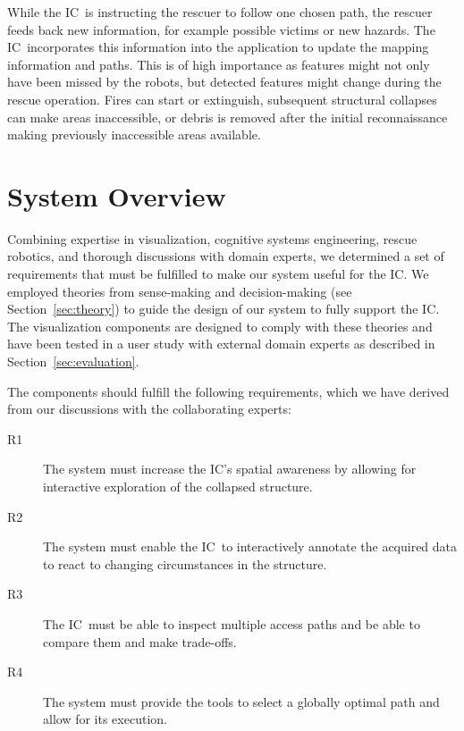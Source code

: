 \documentclass[review,journal]{vgtc}         %
\def\IC{IC}
\begin{document}
While the \IC\ is instructing the rescuer to follow one chosen path, the rescuer feeds back new information, for example possible victims or new hazards. The \IC\ incorporates this information into the application to update the mapping information and paths. This is of high importance as features might not only have been missed by the robots, but detected features might change during the rescue operation. Fires can start or extinguish, subsequent structural collapses can make areas inaccessible, or debris is removed after the initial reconnaissance making previously inaccessible areas available. %


\section{System Overview} \label{sec:overview}

Combining expertise in visualization, cognitive systems engineering, rescue robotics, and thorough discussions with domain experts, we determined a set of requirements that must be fulfilled to make our system useful for the \IC. We employed theories from sense-making and decision-making (see Section~\ref{sec:theory}) to guide the design of our system to fully support the \IC. The visualization components are designed to comply with these theories and have been tested in a user study with external domain experts as described in Section~\ref{sec:evaluation}.

The components should fulfill the following requirements, which we have derived from our discussions with the collaborating experts:

\begin{description}
\item[R1] The system must increase the \IC 's spatial awareness by allowing for interactive exploration of the collapsed structure.
\item[R2] The system must enable the \IC\ to interactively annotate the acquired data to react to changing circumstances in the structure.
\item[R3] The \IC\ must be able to inspect multiple access paths and be able to compare them and make trade-offs.
\item[R4] The system must provide the tools to select a globally optimal path and allow for its execution.
\end{description}
\end{document}
